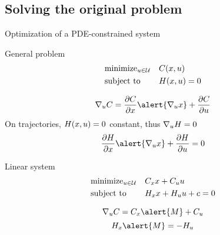 \subsection{Solving the original problem}



\begin{frame}{Optimization of a PDE-constrained system}
\small
\begin{minipage}[t]{0.44\textwidth}
\begin{block}{General problem}
\[
\begin{aligned}
&\text{minimize}_{u \in \mathcal{U}} && C(x,u) \\
&\text{subject to} &&H(x,u) = 0
\end{aligned}
\]
\end{block}
\vspace{-0.2cm}
\[
\nabla_u \cost = \frac{\partial \cost}{\partial x} \alert{\nabla_u x} + \frac{\partial \cost}{\partial u}
\]
On trajectories, $H(x, u) = 0$ constant, thus $\nabla_u H = 0$
\[
\frac{\partial \sys}{\partial x} \alert{\nabla_u x} + \frac{\partial \sys}{\partial u} = 0
\]
\vspace{-0.5cm}
\end{minipage}\hfill
\begin{minipage}[t]{0.52\textwidth}
\begin{block}{Linear system}
\[
\begin{aligned}
&\text{minimize}_{u \in \mathcal{U}} && C_x x + C_u u \\
&\text{subject to} && H_x x + H_u u + c = 0
\end{aligned}
\]
\end{block}
\vspace{-0.2cm}
\[
\nabla_u \cost = \cost_x \alert{M} + \cost_u
\]
\vspace{0.9cm}
\[
\sys_x \alert{M} = - \sys_u
\]
\end{minipage}



\end{frame}


